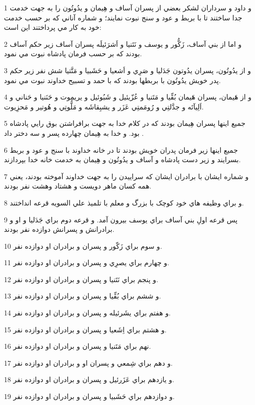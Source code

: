 \par 1 و داود و سرداران لشکر بعضي از پسران آساف و هِيمان و يدُوتُون را به جهت خدمت جدا ساختند تا با بربط و عود و سنج نبوت نمايند؛ و شماره آناني که بر حسب خدمت خود به کار مي پرداختند اين است:
\par 2 و اما از بني آساف، زَکُّور و يوسف و نَتَنيا و اَشرَئيلَه پسران آساف زير حکم آساف بودند که بر حسب فرمان پادشاه نبوت مي نمود.
\par 3 و از يدُوتُون، پسران يدُوتون جَدَليا و صَرِي و اَشعيا و حَشَبيا و مَتَّتيا شش نفر زير حکم پدر خويش يدُوتُون با بربطها بودند که با حمد و تسبيح خداوند نبوت مي نمود.
\par 4 و از هَيمان، پسران هَيمان بُقِّيا و مَتَنيا و عُزّيئيل و شَبُوئيل و يريموت و حَنَنيا و حَناني و اَلِيآتَه و جدَّلتِي و رُومَمتِي عَزَر و يشبِقاشَه و مَلُّوتِي و هُوتير و مَحزِيوت.
\par 5 جميع اينها پسران هِيمان بودند که در کلام خدا به جهت برافراشتن بوق رايي پادشاه بود. و خدا به هِيمان چهارده پسر و سه دختر داد .
\par 6 جميع اينها زير فرمان پدران خويش بودند تا در خانه خداوند با سنج و عود و بربط بسرايند و زير دست پادشاه و آساف و يدُوتُون و هِيمان به خدمت خانه خدا بپردازند.
\par 7 و شماره ايشان با برادران ايشان که سراييدن را به جهت خداوند آموخته بودند، يعني همه کسان ماهر دويست و هشتاد وهشت نفر بودند.
\par 8 و براي وظيفه هاي خود کوچک با بزرگ و معلم با تلميذ علي السويه قرعه انداختند.
\par 9 پس قرعه اولِ بني آساف براي يوسف بيرون آمد. و قرعه دوم براي جَدَليا و او و برادرانش و پسرانش دوازده نفر بودند.
\par 10 و سوم براي زَکّور و پسران و برادران او دوازده نفر.
\par 11 و چهارم براي يصرِي و پسران و برادران او دوازده نفر.
\par 12 و پنجم براي نَتَنيا و پسران و برادران او دوازده نفر.
\par 13 و ششم براي بُقِّيا و پسران و برادران او دوازده نفر.
\par 14 و هفتم براي يشَرئيله و پسران و برادران او دوازده نفر.
\par 15 و هشتم براي اِشَعيا و پسران و برادران او دوازده نفر.
\par 16 نهم براي مَتَنيا و پسران و برادران او دوازده نفر.
\par 17 و دهم براي شِمعي و پسران او و برادران او دوازده نفر.
\par 18 و يازدهم براي عَزَرئيل و پسران و برادران او دوازده نفر.
\par 19 و دوازدهم براي حَشَبيا و پسران و برادران او دوازده نفر.
